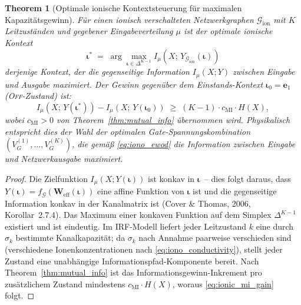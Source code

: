 ﻿\documentclass[12pt, a4paper, openany]{report}
\newtheorem{theorem}{Theorem}[chapter]
\newcommand{\calG}{\mathcal{G}}
\begin{document}
\begin{theorem}[Optimale ionische Kontextsteuerung für maximalen Kapazitätsgewinn]
\label{thm:ionic_optimal_context}
Für einen ionisch verschalteten Netzwerkgraphen $\calG_{\mathrm{ion}}$
mit $K$ Leitzuständen und gegebener Eingabeverteilung $\mu$ ist der
optimale ionische Kontext
\begin{equation}
  \label{eq:ionic_optimal}
  \bm{\iota}^*
  \;=\; \arg\max_{\bm{\iota} \in \Delta^{K-1}} I_\mu(X;\, Y_{\calG_{\mathrm{ion}}}(\bm{\iota}))
\end{equation}
derjenige Kontext, der die gegenseitige Information $I_\mu(X; Y)$ zwischen
Eingabe und Ausgabe maximiert.  Der Gewinn gegenüber dem
Einstands-Kontext $\bm{\iota}_0 = \bm{e}_1$ (\textsc{Off}-Zustand) ist:
\begin{equation}
  \label{eq:ionic_mi_gain}
  I_\mu(X;\, Y(\bm{\iota}^*)) - I_\mu(X;\, Y(\bm{\iota}_0))
  \;\geq\;
  (K-1)\cdot c_{\mathrm{MI}} \cdot H(X),
\end{equation}
wobei $c_{\mathrm{MI}} > 0$ von Theorem~\ref{thm:mutual_info} übernommen wird.
Physikalisch entspricht dies der Wahl der optimalen Gate-Spannungs\-kombination
$(V_G^{(1)}, \ldots, V_G^{(K)})$, die gemäß \eqref{eq:iono_ewod} die
Information zwischen Eingabe und Netzwerkausgabe maximiert.
\end{theorem}

\begin{proof}
Die Zielfunktion $I_\mu(X; Y(\bm{\iota}))$ ist konkav in $\bm{\iota}$~--
dies folgt daraus, dass $Y(\bm{\iota}) = f_{\calG}(\bm{W}_{\mathrm{eff}}(\bm{\iota}))$
eine affine Funktion von $\bm{\iota}$ ist und die gegenseitige Information
konkav in der Kanalmatrix ist (Cover \& Thomas, 2006, Korollar~2.7.4).
Das Maximum einer konkaven Funktion auf dem Simplex $\Delta^{K-1}$ existiert
und ist eindeutig.  Im IRF-Modell liefert jeder Leitzustand $k$ eine durch
$\sigma_k$ bestimmte Kanalkapazität; da $\sigma_k$ nach Annahme paarweise
verschieden sind (verschiedene Ionenkonzentrationen nach
\eqref{eq:iono_conductivity}), stellt jeder Zustand eine unabhängige
Informationspfad-Komponente bereit.  Nach Theorem~\ref{thm:mutual_info}
ist das Informationsgewinn-Inkrement pro zusätzlichem Zustand mindestens
$c_{\mathrm{MI}} \cdot H(X)$, woraus \eqref{eq:ionic_mi_gain} folgt.
\end{proof}
\end{document}

